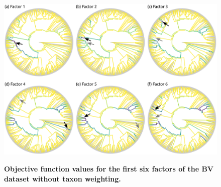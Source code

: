 \begin{figure}[!htb]
    \centering
     \includegraphics[width=\linewidth]{pdf/pf_bv_place_no_tw_ovs.pdf}
    \begin{subfigure}{0pt}
        \label{fig:pf_bv_place_no_tw_ovs:sub:factor_1}
    \end{subfigure}
    \begin{subfigure}{0pt}
        \label{fig:pf_bv_place_no_tw_ovs:sub:factor_2}
    \end{subfigure}
    \begin{subfigure}{0pt}
        \label{fig:pf_bv_place_no_tw_ovs:sub:factor_3}
    \end{subfigure}
    \begin{subfigure}{0pt}
        \label{fig:pf_bv_place_no_tw_ovs:sub:factor_4}
    \end{subfigure}
    \begin{subfigure}{0pt}
        \label{fig:pf_bv_place_no_tw_ovs:sub:factor_5}
    \end{subfigure}
    \begin{subfigure}{0pt}
        \label{fig:pf_bv_place_no_tw_ovs:sub:factor_6}
    \end{subfigure}
    \caption[Objective function values for the first six factors of the \acs{BV} dataset without taxon weighting]{
        \textbf{Objective function values for the first six factors of the \ac{BV} dataset without taxon weighting.}
}
\end{figure}
